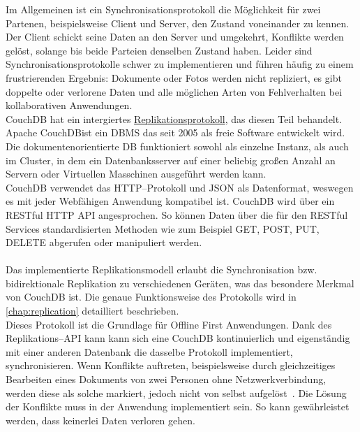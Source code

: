 Im Allgemeinen ist ein Synchronisationsprotokoll die Möglichkeit für zwei Partenen, beispielsweise Client und Server, den Zustand voneinander zu kennen. Der Client schickt seine Daten an den Server und umgekehrt, Konflikte werden gelöst, solange bis beide Parteien denselben Zustand haben.
Leider sind Synchronisationsprotokolle schwer zu implementieren und führen häufig zu einem frustrierenden Ergebnis: Dokumente oder Fotos werden nicht repliziert, es gibt doppelte oder verlorene Daten und alle möglichen Arten von Fehlverhalten bei kollaborativen Anwendungen.\\
CouchDB hat ein intergiertes \hyperref[chap:replication]{Replikationsprotokoll}, das diesen Teil behandelt.  
%
%
Apache CouchDB\tm ist ein \gls{DBMS} das seit 2005 als freie Software entwickelt wird. Die dokumentenorientierte \gls{DB} funktioniert sowohl als einzelne Instanz, als auch im Cluster, in dem ein Datenbanksserver auf einer beliebig großen Anzahl an Servern oder Virtuellen Masschinen ausgeführt werden kann.\\
CouchDB verwendet das \gls{HTTP}--Protokoll und \gls{JSON} als Datenformat, weswegen es mit jeder Webfähigen Anwendung kompatibel ist. CouchDB wird über ein \gls{REST}ful \gls{HTTP} \gls{API} angesprochen. So können Daten über die für den \gls{REST}ful Services standardisierten Methoden wie zum Beispiel GET, POST, PUT, DELETE abgerufen oder manipuliert werden.\\\\
Das implementierte Replikationsmodell erlaubt die Synchronisation bzw. bidirektionale Replikation zu verschiedenen Geräten, was das besondere Merkmal von CouchDB ist. 
Die genaue Funktionsweise des Protokolls wird in \autoref{chap:replication} detailliert beschrieben.\\
Dieses Protokoll ist die Grundlage für Offline First Anwendungen.
Dank des Replikations--\gls{API} kann kann sich eine CouchDB kontinuierlich und eigenständig mit einer anderen Datenbank die dasselbe Protokoll implementiert, synchronisieren.
Wenn Konflikte auftreten, beispielsweise durch gleichzeitiges Bearbeiten eines Dokuments von zwei Personen ohne Netzwerkverbindung, werden diese als solche markiert, jedoch nicht von selbst aufgelöst~\cite{couch}. Die Lösung der Konflikte muss in der Anwendung implementiert sein.
So kann gewährleistet werden, dass keinerlei Daten verloren gehen.\\\\

